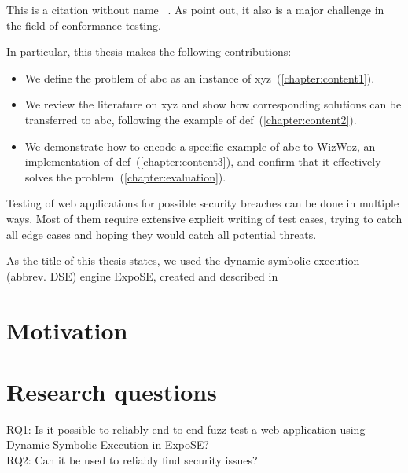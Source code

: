 


This is a citation without name ~\cite{cadar_klee_nodate}.
As \citet{cha_unleashing_2012} point out, it also is a major challenge in the field of conformance testing.


In particular, this thesis makes the following contributions:
\begin{itemize}
    \item We define the problem of abc as an instance of xyz~(\autoref{chapter:content1}).
    \item We review the literature on xyz and show how corresponding solutions can be transferred to abc, following the example of def~(\autoref{chapter:content2}).
    \item We demonstrate how to encode a specific example of abc to WizWoz, an implementation of def~(\autoref{chapter:content3}), and confirm that it effectively solves the problem~(\autoref{chapter:evaluation}).
\end{itemize}


Testing of web applications for possible security breaches can be done in multiple ways. Most of them require extensive explicit writing of test cases, trying to catch all edge cases and hoping they would catch all potential threats. 

As the title of this thesis states, we used the dynamic symbolic execution (abbrev. DSE) engine ExpoSE, created and described in \citet{loring_expose_2017}


\section{Motivation}
\label{sec:motivation}
\section{Research questions}
\label{sec:research-questions}


RQ1: Is it possible to reliably end-to-end fuzz test a web application using Dynamic Symbolic Execution in ExpoSE?\\
RQ2: Can it be used to reliably find security issues?


